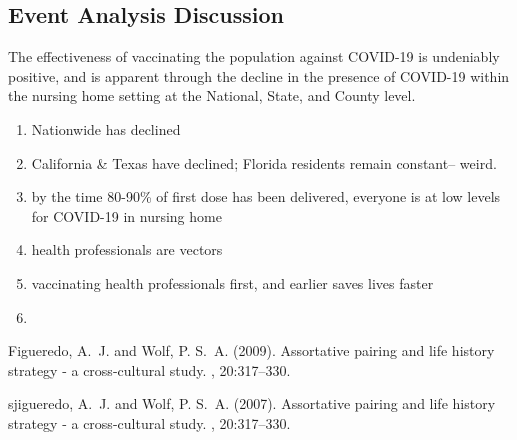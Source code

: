 \documentclass[twoside]{article}
\begin{document}
\begin{multicols}{2}
		
		\subsection{Event Analysis Discussion}
		
		The effectiveness of vaccinating the population against COVID-19 is undeniably positive, and is apparent through the decline in the presence of COVID-19 within the nursing home setting at the National, State, and County level. 
		
		\vspace{5mm}
		
		\begin{enumerate}
			\item Nationwide has declined
			\item California \& Texas have declined; Florida residents remain constant-- weird.
			\item by the time 80-90\% of first dose has been delivered, everyone is at low levels for COVID-19 in nursing home
			\item health professionals are vectors
			\item vaccinating health professionals first, and earlier saves lives faster
			\item 
			
		\end{enumerate} 
		
		
		\begin{thebibliography}{99} %
			
			Figueredo, A.~J. and Wolf, P. S.~A. (2009).
			\newblock Assortative pairing and life history strategy - a cross-cultural
			study.
			, 20:317--330.
			
			sjigueredo, A.~J. and Wolf, P. S.~A. (2007).
			\newblock Assortative pairing and life history strategy - a cross-cultural
			study.
			, 20:317--330.
			
		\end{thebibliography}
		
		
	\end{multicols}
	
\end{document}
